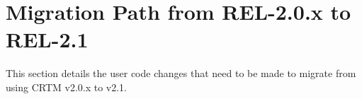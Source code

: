 \chapter{Migration Path from REL-2.0.x to REL-2.1}
\label{sec:migration_path}

This section details the user code changes that need to be made to migrate from using CRTM v2.0.x to v2.1.




